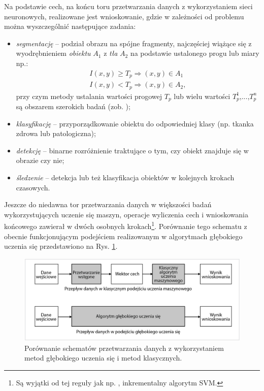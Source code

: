 Na podstawie cech, na końcu toru przetwarzania danych z wykorzystaniem sieci neuronowych, realizowane jest wnioskowanie, gdzie w zależności od problemu można wyszczególnić następujące zadania:
\begin{itemize}[noitemsep,nolistsep]
	\item \textit{segmentację} -- podział obrazu na spójne fragmenty, najczęściej wiążące się \linebreak z wyodrębnieniem \textit{obiektu} $A_1$ z \textit{tła} $A_2$ na podstawie ustalonego progu lub miary np.:
	\begin{equation*}
	\begin{aligned}
	I(x,y) \geq T_p \Rightarrow (x,y) \in A_1 \\
	I(x,y) < T_p \Rightarrow (x,y) \in A_2,
	\end{aligned}
	\end{equation*} 
	przy czym metody ustalania wartości progowej $T_p$ lub wielu wartości {$T_p^1$,...,$T_p^n$} są obszarem szerokich badań (zob. \cite{DBLP:journals/corr/abs-1005-4020});
	\item \textit{klasyfikację} -- przyporządkowanie obiektu do odpowiedniej klasy (np. tkanka zdrowa lub patologiczna);
	\item \textit{detekcję} -- binarne rozróżnienie traktujące o tym, czy obiekt znajduje się \linebreak w obrazie czy nie;
	\item \textit{śledzenie} -- detekcja lub też klasyfikacja obiektów w kolejnych krokach czasowych.
\end{itemize} 

Jeszcze do niedawna tor przetwarzania danych w większości badań wykorzystujących uczenie się maszyn, operacje wyliczenia cech i wnioskowania końcowego zawierał w dwóch osobnych krokach\footnote{Są wyjątki od tej reguły jak np. \cite{10.1007/978-3-319-58667-0_7}, inkrementalny algorytm SVM.}. Porównanie tego schematu z obecnie funkcjonującym podejściem realizowanym w algorytmach głębokiego uczenia się przedstawiono \linebreak na Rys. \ref{DLworkflow}.
\begin{figure}[h!]
	\centering
	\includegraphics[width=1\textwidth]{figures/DLworkflow.png}
	\caption{Porównanie schematów przetwarzania danych z wykorzystaniem metod głębokiego uczenia się i metod klasycznych.}
	\label{DLworkflow}
\end{figure}

